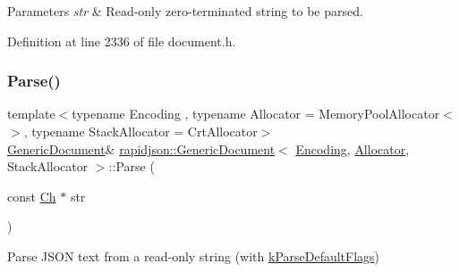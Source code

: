 \begin{DoxyParams}{Parameters}
{\em str} & Read-\/only zero-\/terminated string to be parsed. \\
\hline
\end{DoxyParams}


Definition at line 2336 of file document.\+h.


\begin{DoxyCode}{0}

\end{DoxyCode}
\mbox{\label{classrapidjson_1_1_generic_document_ab031375318d133f83a114314b75703de}} 
\subsubsection{\texorpdfstring{Parse()}{Parse()}\hspace{0.1cm}{\footnotesize\ttfamily [3/6]}}
{\footnotesize\ttfamily template$<$typename Encoding , typename Allocator  = Memory\+Pool\+Allocator$<$$>$, typename Stack\+Allocator  = Crt\+Allocator$>$ \\
\mbox{\hyperlink{classrapidjson_1_1_generic_document}{Generic\+Document}}\& \mbox{\hyperlink{classrapidjson_1_1_generic_document}{rapidjson\+::\+Generic\+Document}}$<$ \mbox{\hyperlink{classrapidjson_1_1_encoding}{Encoding}}, \mbox{\hyperlink{classrapidjson_1_1_allocator}{Allocator}}, Stack\+Allocator $>$\+::Parse (\begin{DoxyParamCaption}\item[{const \mbox{\hyperlink{classrapidjson_1_1_generic_value_adcdbc7fa85a9a41b78966d7e0dcc2ac4}{Ch}} $\ast$}]{str }\end{DoxyParamCaption})}



Parse J\+S\+ON text from a read-\/only string (with \mbox{\hyperlink{namespacerapidjson_a81379eb4e94a0386d71d15fda882ebc9a5640cb00db7814b7f22be3683dda9835}{k\+Parse\+Default\+Flags}}) 


